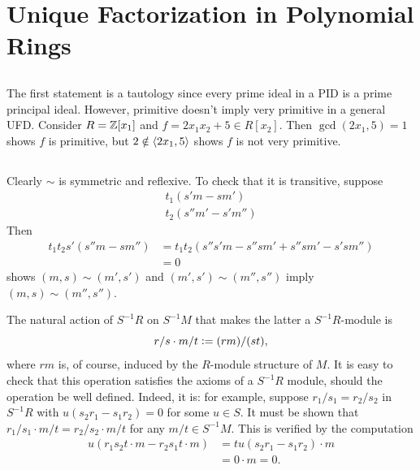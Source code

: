 \documentclass[12pt]{article}
\begin{document}
\section{Unique Factorization in Polynomial Rings}
\setcounter{subsection}{3} 
\subsection{} 
The first statement is a tautology since every prime ideal in a PID is a prime principal ideal. 
However, primitive doesn't imply very primitive in a general UFD. 
Consider $R = \mathbb{Z}[x_1]$ and $f = 2x_1 x_2 + 5 \in R[x_2]$. 
Then $\gcd(2x_1, 5) = 1$ shows $f$ is primitive, but $2 \notin \langle2x_1, 5\rangle$ shows $f$ is not very primitive. 

\setcounter{subsection}{7} 
\subsection{} 
Clearly $\sim$ is symmetric and reflexive. 
To check that it is transitive, suppose 
\begin{gather*} 
  t_1(s'm - sm') \\ 
  t_2(s''m' - s'm'') 
\end{gather*}
Then 
\begin{align*}
  t_1 t_2 s' (s''m - sm'') & = t_1 t_2 (s'' s' m - s'' sm' + s'' sm' - s' sm'') \\ 
						   & = 0
\end{align*}
shows $(m, s) \sim (m', s')$ and $(m', s') \sim (m'', s'')$ imply $(m, s) \sim (m'', s'')$. 

The natural action of $S^{-1}R$ on $S^{-1} M$ that makes the latter a $S^{-1}R$-module is 
$$r/s \cdot m/t \vcentcolon= (rm)/(st),$$
where $rm$ is, of course, induced by the $R$-module structure of $M$. 
It is easy to check that this operation satisfies the axioms of a $S^{-1}R$ module, should the operation be well defined. 
Indeed, it is: 
for example, suppose $r_1 / s_1 = r_2 / s_2$ in $S^{-1}R$ with $u(s_2 r_1 - s_1 r_2) = 0$ for some $u \in S$. 
It must be shown that $r_1 / s_1 \cdot m / t = r_2 / s_2 \cdot m / t$ for any $m / t \in S^{-1} M$. 
This is verified by the computation 
\begin{align*}
  u(r_1 s_2 t \cdot m - r_2 s_1 t \cdot m) & = tu(s_2 r_1 - s_1 r_2) \cdot m \\ 
										   & = 0 \cdot m = 0.
\end{align*}

\subsection{} 
\end{document}
